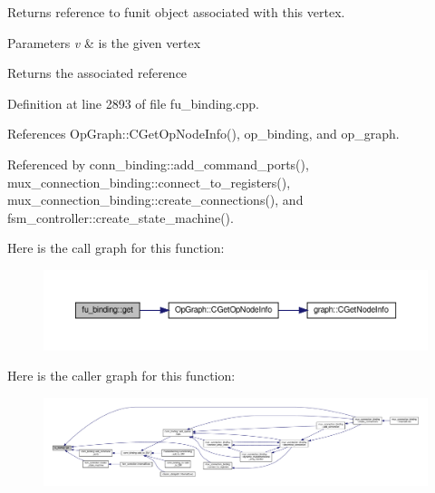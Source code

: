 Returns reference to funit object associated with this vertex. 


\begin{DoxyParams}{Parameters}
{\em v} & is the given vertex \\
\hline
\end{DoxyParams}
\begin{DoxyReturn}{Returns}
the associated reference 
\end{DoxyReturn}


Definition at line 2893 of file fu\+\_\+binding.\+cpp.



References Op\+Graph\+::\+C\+Get\+Op\+Node\+Info(), op\+\_\+binding, and op\+\_\+graph.



Referenced by conn\+\_\+binding\+::add\+\_\+command\+\_\+ports(), mux\+\_\+connection\+\_\+binding\+::connect\+\_\+to\+\_\+registers(), mux\+\_\+connection\+\_\+binding\+::create\+\_\+connections(), and fsm\+\_\+controller\+::create\+\_\+state\+\_\+machine().

Here is the call graph for this function\+:
\nopagebreak
\begin{figure}[H]
\begin{center}
\leavevmode
\includegraphics[width=350pt]{d8/d04/classfu__binding_afbc918cf6838696e8c4f0373ccac09ac_cgraph}
\end{center}
\end{figure}
Here is the caller graph for this function\+:
\nopagebreak
\begin{figure}[H]
\begin{center}
\leavevmode
\includegraphics[width=350pt]{d8/d04/classfu__binding_afbc918cf6838696e8c4f0373ccac09ac_icgraph}
\end{center}
\end{figure}
\mbox{\label{classfu__binding_a896dbcb71c9389ef6056d44158962130}} 
